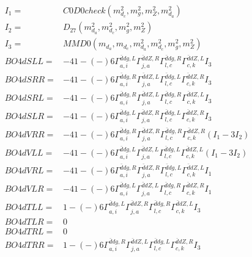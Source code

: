 \documentclass[A4,landscape]{article}
\begin{document}
\begin{align} 
I_1 = & C0D0check(m^2_{d_{{c}}}, m^2_{g}, m^2_{Z}, m^2_{d_{{a}}}) \\ 
I_2 = & D_{27}(m^2_{d_{{a}}}, m^2_{d_{{c}}}, m^2_{g}, m^2_{Z}) \\ 
I_3 = & MMD0(m_{d_{{a}}}, m_{d_{{c}}}, m^2_{d_{{a}}}, m^2_{d_{{c}}}, m^2_{g}, m^2_{Z}) \\ 
  BO4dSLL= & -4   1
-(-)
  6 \Gamma^{\bar{d}d g ,L}_{a, i} \Gamma^{\bar{d}d Z ,R}_{j, a} \Gamma^{\bar{d}d g ,R}_{l, c} \Gamma^{\bar{d}d Z ,L}_{c, k} I_3 \\ 
  BO4dSRR= & -4   1
-(-)
  6 \Gamma^{\bar{d}d g ,R}_{a, i} \Gamma^{\bar{d}d Z ,L}_{j, a} \Gamma^{\bar{d}d g ,L}_{l, c} \Gamma^{\bar{d}d Z ,R}_{c, k} I_3 \\ 
  BO4dSRL= & -4   1
-(-)
  6 \Gamma^{\bar{d}d g ,R}_{a, i} \Gamma^{\bar{d}d Z ,L}_{j, a} \Gamma^{\bar{d}d g ,R}_{l, c} \Gamma^{\bar{d}d Z ,L}_{c, k} I_3 \\ 
  BO4dSLR= & -4   1
-(-)
  6 \Gamma^{\bar{d}d g ,L}_{a, i} \Gamma^{\bar{d}d Z ,R}_{j, a} \Gamma^{\bar{d}d g ,L}_{l, c} \Gamma^{\bar{d}d Z ,R}_{c, k} I_3 \\ 
  BO4dVRR= & -4   1
-(-)
  6 \Gamma^{\bar{d}d g ,R}_{a, i} \Gamma^{\bar{d}d Z ,R}_{j, a} \Gamma^{\bar{d}d g ,R}_{l, c} \Gamma^{\bar{d}d Z ,R}_{c, k} (I_1 - 3 I_2) \\ 
  BO4dVLL= & -4   1
-(-)
  6 \Gamma^{\bar{d}d g ,L}_{a, i} \Gamma^{\bar{d}d Z ,L}_{j, a} \Gamma^{\bar{d}d g ,L}_{l, c} \Gamma^{\bar{d}d Z ,L}_{c, k} (I_1 - 3 I_2) \\ 
  BO4dVRL= & -4   1
-(-)
  6 \Gamma^{\bar{d}d g ,R}_{a, i} \Gamma^{\bar{d}d Z ,R}_{j, a} \Gamma^{\bar{d}d g ,L}_{l, c} \Gamma^{\bar{d}d Z ,L}_{c, k} I_1 \\ 
  BO4dVLR= & -4   1
-(-)
  6 \Gamma^{\bar{d}d g ,L}_{a, i} \Gamma^{\bar{d}d Z ,L}_{j, a} \Gamma^{\bar{d}d g ,R}_{l, c} \Gamma^{\bar{d}d Z ,R}_{c, k} I_1 \\ 
  BO4dTLL= &   1
-(-)
  6 \Gamma^{\bar{d}d g ,L}_{a, i} \Gamma^{\bar{d}d Z ,R}_{j, a} \Gamma^{\bar{d}d g ,R}_{l, c} \Gamma^{\bar{d}d Z ,L}_{c, k} I_3 \\ 
  BO4dTLR= & 0 \\ 
  BO4dTRL= & 0 \\ 
  BO4dTRR= &   1
-(-)
  6 \Gamma^{\bar{d}d g ,R}_{a, i} \Gamma^{\bar{d}d Z ,L}_{j, a} \Gamma^{\bar{d}d g ,L}_{l, c} \Gamma^{\bar{d}d Z ,R}_{c, k} I_3 \\ 
\end{align} 
\end{document}
